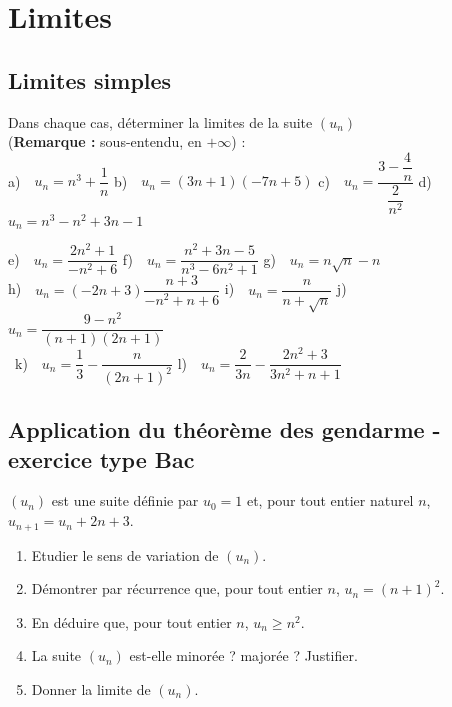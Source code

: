 \chapter{Limites}

\section{Limites simples}

Dans chaque cas, déterminer la limites de la suite $\left(u_n\right)$ \\ (\textbf{Remarque :} sous-entendu, en $+\infty$) : \\

a)\ \ $u_n=n^3+\dfrac{1}{n}$ 
\quad
b)\ \ $u_n=(3n+1)(-7n+5)$
\quad
c)\ \ $u_n=\dfrac{3-\dfrac{4}{n}}{\dfrac{2}{n^2}}$
\quad
d)\ \ $u_n=n^3-n^2+3n-1$

e)\ \ $u_n=\dfrac{2n^2+1}{-n^2+6}$
\quad
f)\ \ $u_n=\dfrac{n^2+3n-5}{n^3-6n^2+1}$
\quad
g)\ \ $u_n=n\sqrt{n}-n$
\\
h)\ \ $u_n=(-2n+3)\dfrac{n+3}{-n^2+n+6}$
\quad
i)\ \ $u_n=\dfrac{n}{n+\sqrt{n}}$ 
\quad
j)\ \ $u_n=\dfrac{9-n^2}{(n+1)(2n+1)}$
\\\
k)\ \ $u_n=\dfrac13-\dfrac{n}{(2n+1)^2}$
\quad
l)\ \ $u_n=\dfrac{2}{3n}-\dfrac{2n^2+3}{3n^2+n+1}$

\section{Application du théorème des gendarme - exercice type Bac}

$(u_n)$ est une suite définie par $u_0=1$ et,
pour tout entier naturel $n$, $u_{n+1}=u_n+2n+3$. 

\begin{enumerate}
\item Etudier le sens de variation de $(u_n)$. 
\item Démontrer par récurrence que, 
  pour tout entier $n$, $u_n=(n+1)^2$. 
\item En déduire que, pour tout entier $n$, 
  $u_n\geqslant n^2$.
\item La suite $(u_n)$ est-elle minorée ? majorée ? 
  Justifier. 
\item Donner la limite de $(u_n)$. 
\end{enumerate}